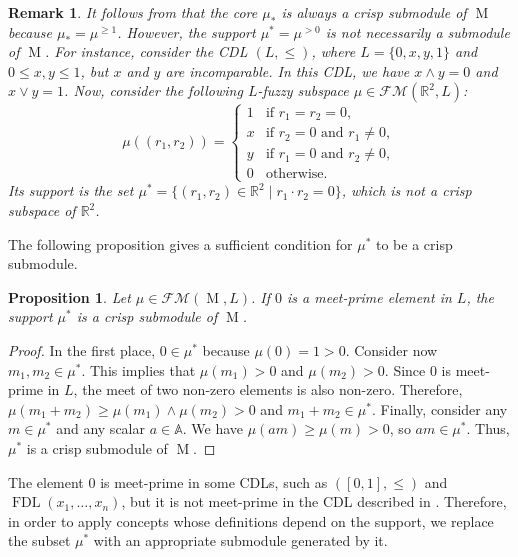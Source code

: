 \documentclass[a4paper,10pt]{article}
\newtheorem{proposition}[theorem]{Proposition}
\newtheorem{remark}[theorem]{Remark}
\newcommand{\bba}{\mathbb{A}}
\newcommand{\bbr}{\mathbb{R}}
\newcommand{\calfm}{\mathcal{F\!M}}
\DeclareMathOperator{\fdl}{FDL}
\DeclareMathOperator{\Mo}{M}
\begin{document}
\begin{remark}
\label{rem:supportcorelevelset}
It follows from  that the core \(\mu_*\) is always a crisp submodule of \(\Mo\) because \(\mu_* = \mu^{\geq 1}\). However, the support \(\mu^* = \mu^{>0}\) is not necessarily a submodule of \(\Mo\). For instance, consider the CDL \((L,\leq)\), where \(L = \{0, x, y, 1\}\) and \(0 \leq x, y \leq 1\), but \(x\) and \(y\) are incomparable. In this CDL, we have \(x \wedge y = 0\) and \(x \vee y = 1\). Now, consider the following \(L\)-fuzzy subspace \(\mu \in \calfm(\bbr^2,L)\):
\[
\mu((r_1,r_2)) =
\begin{cases}
1 & \text{if } r_1 = r_2 = 0,\\
x & \text{if } r_2 = 0 \text{ and } r_1 \neq 0,\\
y & \text{if } r_1 = 0 \text{ and } r_2 \neq 0,\\
0 & \text{otherwise.}
\end{cases}
\]
Its support is the set \(\mu^* = \{(r_1, r_2) \in \bbr^2 \mid r_1 \cdot r_2 = 0\}\), which is not a crisp subspace of \(\bbr^2\). 
\end{remark}

The following proposition gives a sufficient condition for \(\mu^*\) to be a crisp submodule.

\begin{proposition}
\label{prop:meet-prime}
Let \(\mu \in \calfm(\Mo,L)\). If \(0\) is a meet-prime element in \(L\), the support \(\mu^*\) is a crisp submodule of \(\Mo\).
\end{proposition}

\begin{proof}
In the first place, \(0 \in \mu^*\) because \(\mu(0)=1 >0\). Consider now \(m_1,m_2 \in \mu^*\). This implies that \(\mu(m_1)>0\) and \(\mu(m_2)>0\). Since \(0\) is meet-prime in \(L\), the meet of two non-zero elements is also non-zero. Therefore, \(\mu(m_1+m_2) \geq \mu(m_1) \wedge \mu(m_2)>0\) and \(m_1+m_2 \in \mu^*\). Finally, consider any \(m \in \mu^*\) and any scalar \(a \in \bba\). We have \(\mu(am) \geq \mu(m)>0\), so \(am \in \mu^*\). Thus, \(\mu^*\) is a crisp submodule of \(\Mo\).
\end{proof}

The element \(0\) is meet-prime in some CDLs, such as \(([0,1],\leq)\) and \(\fdl(x_1,\dots,x_n)\), but it is not meet-prime in the CDL described in . Therefore, in order to apply concepts whose definitions depend on the support, we replace the subset \(\mu^*\) with an appropriate submodule generated by it.
\end{document}
